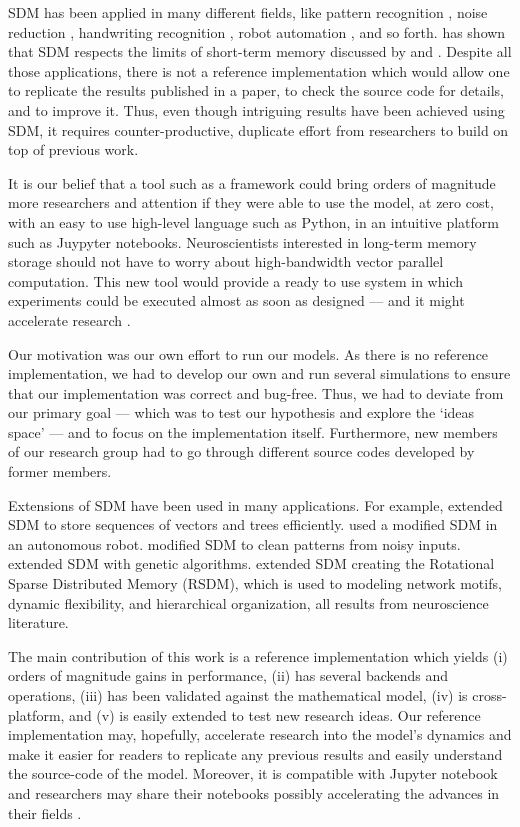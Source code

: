 SDM has been applied in many different fields, like pattern recognition \citep{norman2003modeling, rao1995natural}, noise reduction \citep{Meng2009}, handwriting recognition \citep{fan1997genetic}, robot automation \citep{Rajesh1998, mendes2008robot}, and so forth. \citet{Linhares2011} has shown that SDM respects the limits of short-term memory discussed by \citet{Miller1955} and \citet{Cowan2001}. Despite all those applications, there is not a reference implementation which would allow one to replicate the results published in a paper, to check the source code for details, and to improve it. Thus, even though intriguing results have been achieved using SDM, it requires counter-productive, duplicate effort from researchers to build on top of previous work.

It is our belief that a tool such as a framework could bring orders of magnitude more researchers and attention if they were able to use the model, at zero cost, with an easy to use high-level language such as Python, in an intuitive platform such as Juypyter notebooks. Neuroscientists interested in long-term memory storage should not have to worry about high-bandwidth vector parallel computation.  This new tool would provide a ready to use system in which experiments could be executed almost as soon as designed --- and it might accelerate research \citep{shen2014interactive}.

Our motivation was our own effort to run our models. As there is no reference implementation, we had to develop our own and run several simulations to ensure that our implementation was correct and bug-free. Thus, we had to deviate from our primary goal --- which was to test our hypothesis and explore the `ideas space' --- and to focus on the implementation itself. Furthermore, new members of our research group had to go through different source codes developed by former members.

Extensions of SDM have been used in many applications. For example, \citet{Snaider2011} extended SDM to store sequences of vectors and trees efficiently.  \citet{Rajesh1998} used a modified SDM in an autonomous robot. \citet{Meng2009} modified SDM to clean patterns from noisy inputs. \citet{fan1997genetic} extended SDM with genetic algorithms. \citet{chada2016you} extended SDM creating the Rotational Sparse Distributed Memory (RSDM), which is used to modeling network motifs, dynamic flexibility, and hierarchical organization, all results from neuroscience literature.

The main contribution of this work is a reference implementation which yields (i) orders of magnitude gains in performance, (ii) has several backends and operations, (iii) has been validated against the mathematical model, (iv) is cross-platform, and (v) is easily extended to test new research ideas. Our reference implementation may, hopefully, accelerate research into the model's dynamics and make it easier for readers to replicate any previous results and easily understand the source-code of the model.  Moreover, it is compatible with Jupyter notebook and researchers may share their notebooks possibly accelerating the advances in their fields \citep{shen2014interactive}.

